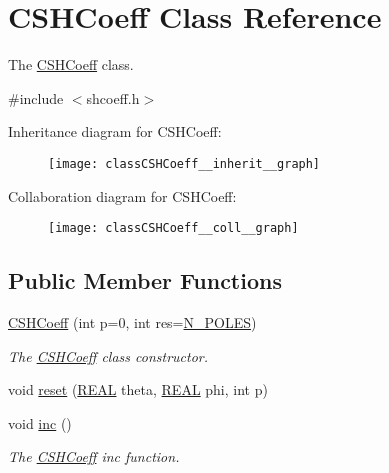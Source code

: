 \hypertarget{classCSHCoeff}{\section{C\-S\-H\-Coeff Class Reference}
\label{classCSHCoeff}
}


The \hyperlink{classCSHCoeff}{C\-S\-H\-Coeff} class.  




{\ttfamily \#include $<$shcoeff.\-h$>$}



Inheritance diagram for C\-S\-H\-Coeff\-:\nopagebreak
\begin{figure}[H]
\begin{center}
\leavevmode
\texttt{[image: classCSHCoeff\_\_inherit\_\_graph]}
\end{center}
\end{figure}


Collaboration diagram for C\-S\-H\-Coeff\-:\nopagebreak
\begin{figure}[H]
\begin{center}
\leavevmode
\texttt{[image: classCSHCoeff\_\_coll\_\_graph]}
\end{center}
\end{figure}
\subsection*{Public Member Functions}
\begin{DoxyCompactItemize}
\item 
\hyperlink{classCSHCoeff_a286a374e16fd7741f869fe5edb1ef9d4}{C\-S\-H\-Coeff} (int p=0, int res=\hyperlink{mcoeff_8h_ac23f9c13c5d07d9ce386f7a830c35e5a}{N\-\_\-\-P\-O\-L\-E\-S})
\begin{DoxyCompactList}\small\item\em The \hyperlink{classCSHCoeff}{C\-S\-H\-Coeff} class constructor. \end{DoxyCompactList}\item 
void \hyperlink{classCSHCoeff_a7aa1d16fe8a3e18012f2ccaec89a0a0f}{reset} (\hyperlink{util_8h_a5821460e95a0800cf9f24c38915cbbde}{R\-E\-A\-L} theta, \hyperlink{util_8h_a5821460e95a0800cf9f24c38915cbbde}{R\-E\-A\-L} phi, int p)
\item 
void \hyperlink{classCSHCoeff_adf80cf8370b4db9957de7acfe8aa64d6}{inc} ()
\begin{DoxyCompactList}\small\item\em The \hyperlink{classCSHCoeff}{C\-S\-H\-Coeff} inc function. \end{DoxyCompactList}\end{DoxyCompactItemize}
